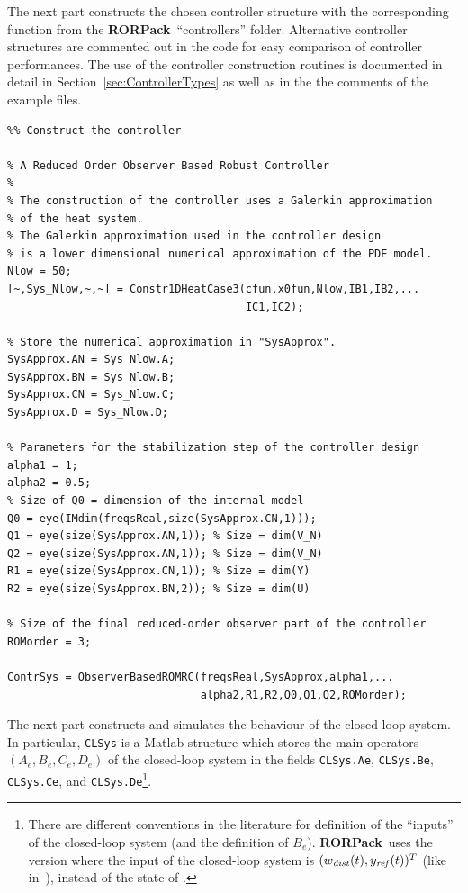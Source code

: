 \documentclass[11pt, a4paper]{amsart}
\theoremstyle{definition}
\numberwithin{equation}{section}
\newcommand{\yref}{y_{\mbox{\scriptsize\textit{ref}}}}
\newcommand{\wdist}{w_{\mbox{\scriptsize\textit{dist}}}}
\newcommand{\RORname}{\textbf{RORPack}}
\begin{document}
The next part constructs the chosen controller structure with the corresponding function from the \RORname\ ``controllers'' folder. Alternative controller structures are commented out in the code for easy comparison of controller performances.
The use of the controller construction routines is documented in detail in Section~\ref{sec:ControllerTypes} as well as in the the comments of the example files.

\begin{lstlisting} 
%% Construct the controller

% A Reduced Order Observer Based Robust Controller
%
% The construction of the controller uses a Galerkin approximation
% of the heat system.
% The Galerkin approximation used in the controller design 
% is a lower dimensional numerical approximation of the PDE model.
Nlow = 50;
[~,Sys_Nlow,~,~] = Constr1DHeatCase3(cfun,x0fun,Nlow,IB1,IB2,...  
                                     IC1,IC2);

% Store the numerical approximation in "SysApprox".
SysApprox.AN = Sys_Nlow.A;
SysApprox.BN = Sys_Nlow.B;
SysApprox.CN = Sys_Nlow.C;
SysApprox.D = Sys_Nlow.D;

% Parameters for the stabilization step of the controller design
alpha1 = 1;
alpha2 = 0.5;
% Size of Q0 = dimension of the internal model
Q0 = eye(IMdim(freqsReal,size(SysApprox.CN,1))); 
Q1 = eye(size(SysApprox.AN,1)); % Size = dim(V_N)
Q2 = eye(size(SysApprox.AN,1)); % Size = dim(V_N)
R1 = eye(size(SysApprox.CN,1)); % Size = dim(Y)
R2 = eye(size(SysApprox.BN,2)); % Size = dim(U)

% Size of the final reduced-order observer part of the controller
ROMorder = 3;

ContrSys = ObserverBasedROMRC(freqsReal,SysApprox,alpha1,...
                              alpha2,R1,R2,Q0,Q1,Q2,ROMorder);
\end{lstlisting}

The next part constructs and simulates the behaviour of the closed-loop system. In particular, \texttt{CLSys} is a Matlab structure which stores the main operators $(A_e,B_e,C_e,D_e)$ of the closed-loop system in the fields \texttt{CLSys.Ae}, \texttt{CLSys.Be},   \texttt{CLSys.Ce}, and \texttt{CLSys.De}\footnote{There are different conventions in the literature for definition of the ``inputs'' of the closed-loop system (and the definition of $B_e$). \RORname\ uses the version where the input of the closed-loop system is $(\wdist(t),\yref(t))^T$ (like in~\cite{PauPha20}), instead of the state of .}.
\end{document}
